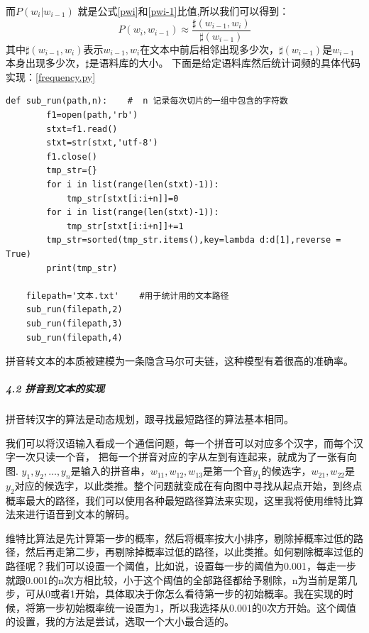\documentclass[12pt,a4paper,fancyhdr,openany,oneside]{ctexbook}
\begin{document}
而$P\left ( w_i|w_{i-1}\right )$ 就是公式\ref{pwi}和\ref{pwi-1}比值,所以我们可以得到：
\begin{equation}
    P\left ( w_i,w_{i-1}\right ) \approx  \frac{\sharp \left ( w_{i-1},w_i\right )}{\sharp\left ( w_{i-1}\right )} 
\end{equation}
其中$\sharp \left ( w_{i-1},w_i\right )$表示$w_{i-1},w_i$在文本中前后相邻出现多少次，$\sharp \left ( w_{i-1}\right )$是$w_{i-1}$
本身出现多少次，$\sharp $是语料库的大小。
下面是给定语料库然后统计词频的具体代码实现：\ref{frequency.py}
\begin{lstlisting}[style=Python, caption={frequency.py}, label={frequency.py}]
    def sub_run(path,n):    #  n 记录每次切片的一组中包含的字符数
        f1=open(path,'rb')
        stxt=f1.read()
        stxt=str(stxt,'utf-8')
        f1.close()
        tmp_str={}
        for i in list(range(len(stxt)-1)):
            tmp_str[stxt[i:i+n]]=0  
        for i in list(range(len(stxt)-1)):
            tmp_str[stxt[i:i+n]]+=1
        tmp_str=sorted(tmp_str.items(),key=lambda d:d[1],reverse = True)
        print(tmp_str)
    
    filepath='文本.txt'    #用于统计用的文本路径
    sub_run(filepath,2)
    sub_run(filepath,3)
    sub_run(filepath,4)
\end{lstlisting}





拼音转文本的本质被建模为一条隐含马尔可夫链，这种模型有着很高的准确率。


\subparagraph{4.2 拼音到文本的实现} 拼音转汉字的算法是动态规划，跟寻找最短路径的算法基本相同。

我们可以将汉语输入看成一个通信问题，每一个拼音可以对应多个汉字，而每个汉字一次只读一个音，
把每一个拼音对应的字从左到有连起来，就成为了一张有向图.
$y_1,y_2,…,y_n$是输入的拼音串，$w_{11},w_{12},w_{13}$是第一个音$y_1$的候选字，$w_{21},w_{22}$是$y_2$对应的候选字，以此类推。整个问题就变成在有向图中寻找从起点开始，到终点概率最大的路径，我们可以使用各种最短路径算法来实现，这里我将使用维特比算法来进行语音到文本的解码。

维特比算法是先计算第一步的概率，然后将概率按大小排序，剔除掉概率过低的路径，然后再走第二步，再剔除掉概率过低的路径，以此类推。如何剔除概率过低的路径呢？我们可以设置一个阈值，比如说，设置每一步的阈值为0.001，每走一步就跟0.001的n次方相比较，小于这个阈值的全部路径都给予剔除，n为当前是第几步，可从0或者1开始，具体取决于你怎么看待第一步的初始概率。我在实现的时候，将第一步初始概率统一设置为1，所以我选择从0.001的0次方开始。这个阈值的设置，我的方法是尝试，选取一个大小最合适的。
\end{document}
